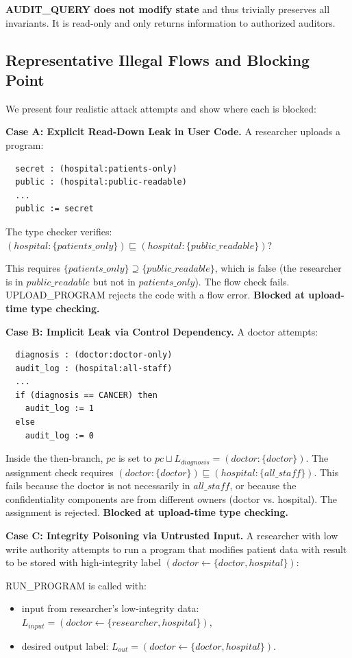 \textbf{AUDIT\_QUERY does not modify state} and thus trivially preserves all invariants. It is read-only and only returns information to authorized auditors.

\subsection{Representative Illegal Flows and Blocking Point}

We present four realistic attack attempts and show where each is blocked:

\textbf{Case A: Explicit Read-Down Leak in User Code.} A researcher uploads a program:
\begin{verbatim}
  secret : (hospital:patients-only)
  public : (hospital:public-readable)
  ...
  public := secret
\end{verbatim}

The type checker verifies: $(hospital:\{patients\_only\}) \sqsubseteq (hospital:\{public\_readable\})$?

This requires $\{patients\_only\} \supseteq \{public\_readable\}$, which is false (the researcher is in $public\_readable$ but not in $patients\_only$). The flow check fails. UPLOAD\_PROGRAM rejects the code with a flow error. \textbf{Blocked at upload-time type checking.}

\textbf{Case B: Implicit Leak via Control Dependency.} A doctor attempts:
\begin{verbatim}
  diagnosis : (doctor:doctor-only)
  audit_log : (hospital:all-staff)
  ...
  if (diagnosis == CANCER) then
    audit_log := 1
  else
    audit_log := 0
\end{verbatim}

Inside the then-branch, $pc$ is set to $pc \sqcup L_{diagnosis} = (doctor:\{doctor\})$. The assignment check requires $(doctor:\{doctor\}) \sqsubseteq (hospital:\{all\_staff\})$. This fails because the doctor is not necessarily in $all\_staff$, or because the confidentiality components are from different owners (doctor vs. hospital). The assignment is rejected. \textbf{Blocked at upload-time type checking.}

\textbf{Case C: Integrity Poisoning via Untrusted Input.} A researcher with low write authority attempts to run a program that modifies patient data with result to be stored with high-integrity label $(doctor \leftarrow \{doctor,hospital\})$:

RUN\_PROGRAM is called with:
\begin{itemize}
    \item input from researcher's low-integrity data: $L_{input} = (doctor \leftarrow \{researcher,hospital\})$,
    \item desired output label: $L_{out} = (doctor \leftarrow \{doctor,hospital\})$.
\end{itemize}

